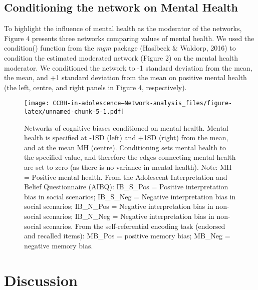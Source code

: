 \documentclass[
  english,
  man,floatsintext]{apa6}
\begin{document}
\hypertarget{conditioning-the-network-on-mental-health}{%
\subsection{Conditioning the network on Mental Health}\label{conditioning-the-network-on-mental-health}}

To highlight the influence of mental health as the moderator of the networks, Figure 4 presents three networks comparing values of mental health. We used the condition() function from the \emph{mgm} package (Haslbeck \& Waldorp, 2016) to condition the estimated moderated network (Figure 2) on the mental health moderator. We conditioned the network to -1 standard deviation from the mean, the mean, and +1 standard deviation from the mean on positive mental health (the left, centre, and right panels in Figure 4, respectively).

\begin{figure}
\centering
\texttt{[image: CCBH-in-adolescence---Network-analysis\_files/figure-latex/unnamed-chunk-5-1.pdf]}
\caption{\label{fig:unnamed-chunk-5}Networks of cognitive biases conditioned on mental health. Mental health is specified at -1SD (left) and +1SD (right) from the mean, and at the mean MH (centre). Conditioning sets mental health to the specified value, and therefore the edges connecting mental health are set to zero (as there is no variance in mental health).
Note: MH = Positive mental health. From the Adolescent Interpretation and Belief Questionnaire (AIBQ): IB\_S\_Pos = Positive interpretation bias in social scenarios; IB\_S\_Neg = Negative interpretation bias in social scenarios; IB\_N\_Pos = Negative interpretation bias in non-social scenarios; IB\_N\_Neg = Negative interpretation bias in non-social scenarios. From the self-referential encoding task (endorsed and recalled items): MB\_Pos = positive memory bias; MB\_Neg = negative memory bias.}
\end{figure}

\hypertarget{discussion}{%
\section{Discussion}\label{discussion}}
\end{document}
